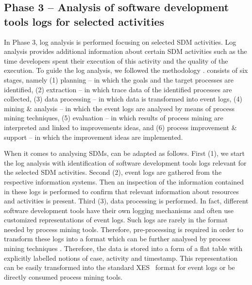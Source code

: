 \subsection{Phase 3 – Analysis of software development tools logs for selected activities}

In Phase 3, log analysis is performed focusing on selected SDM activities. Log analysis
provides additional information about certain SDM activities such as the time developers spent their
execution of this activity and the quality of the execution. To guide the log analysis, we followed the
\pmsquare methodology \citep{DBLP:conf/caise/EckLLA15}. \pmsquare consists of six stages, namely
(1) planning – in which the goals and the target processes are identified, (2) extraction – in which trace data
of the identified processes are collected, (3) data processing – in which data is transformed into
event logs, (4) mining \& analysis – in which the event logs are analysed by means of process mining
techniques, (5) evaluation – in which results of process mining are interpreted and linked to
improvements ideas, and (6) process improvement \& support – in which the improvement ideas are
implemented.

When it comes to analysing SDMs, \pmsquare can be adapted as follows. First (1), we start the log
analysis with identification of software development tools logs relevant for the selected SDM
activities. Second (2), event logs are gathered from the respective information systems. Then an
inspection of the information contained in these logs is performed to confirm that relevant
information about resources and activities is present. Third (3), data processing is performed. In fact,
different software development tools have their own logging mechanisms and often use customized
representations of event logs. Such logs are rarely in the format needed by process mining tools.
Therefore, pre-processing is required in order to transform these logs into a format which can be further analysed by process mining techniques \citep{DBLP:journals/tkde/AalstWM04,DBLP:conf/bpm/LeemansFA14}. Therefore, the data is stored into a form of a flat table with explicitly
labelled notions of case, activity and timestamp. This representation can be easily transformed into
the standard XES~\citep{verbeek2010xes} format for event logs or be
directly consumed process mining tools.

